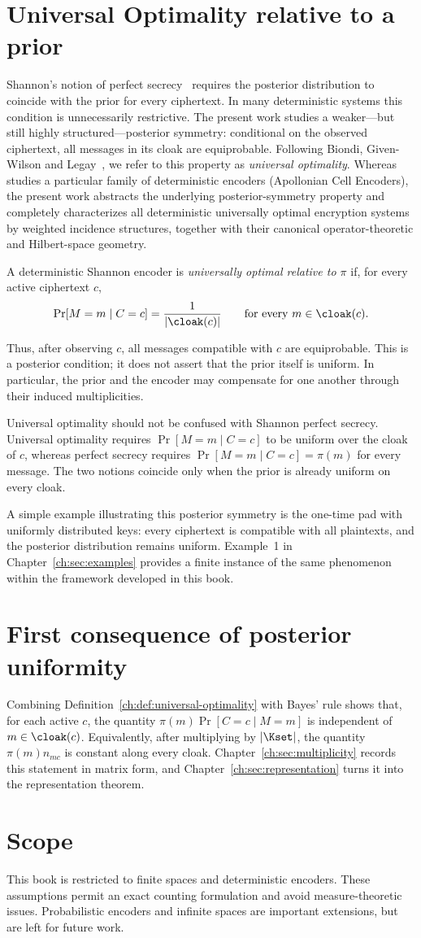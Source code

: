 \section{Universal Optimality relative to a prior}
Shannon's notion of perfect secrecy~\cite{shannon1949} requires the posterior distribution to coincide with the prior for every ciphertext.  In many deterministic systems this condition is unnecessarily restrictive.  The present work studies a weaker---but still highly structured---posterior symmetry: conditional on the observed ciphertext, all messages in its cloak are equiprobable.  Following Biondi, Given-Wilson and Legay~\cite{biondi2018apollonian}, we refer to this property as \emph{universal optimality}.
Whereas~\cite{biondi2018apollonian} studies a particular family of deterministic encoders (Apollonian Cell Encoders), the present work abstracts the underlying posterior-symmetry property and completely characterizes all deterministic universally optimal encryption systems by weighted incidence structures, together with their canonical operator-theoretic and Hilbert-space geometry.
\begin{definition}\label{ch:def:universal-optimality}
A deterministic Shannon encoder is \emph{universally optimal relative to $\pi$} if, for every active ciphertext $c$,
\[
  \Pr[M=m\mid C=c]=\frac{1}{|\cloak(c)|}
  \qquad\text{for every }m\in\cloak(c).
\]
\end{definition}
Thus, after observing $c$, all messages compatible with $c$ are equiprobable. This is a posterior condition; it does not assert that the prior itself is uniform. In particular, the prior and the encoder may compensate for one another through their induced multiplicities.
\begin{remark}
Universal optimality should not be confused with Shannon perfect secrecy.  Universal optimality requires $\Pr[M=m\mid C=c]$ to be uniform over the cloak of $c$, whereas perfect secrecy requires $\Pr[M=m\mid C=c]=\pi(m)$ for every message.  The two notions coincide only when the prior is already uniform on every cloak.
\end{remark}
A simple example illustrating this posterior symmetry is the one-time pad with uniformly distributed keys: every ciphertext is compatible with all plaintexts, and the posterior distribution remains uniform.  Example~1 in Chapter~\ref{ch:sec:examples} provides a finite instance of the same phenomenon within the framework developed in this book.
\section{First consequence of posterior uniformity}
Combining Definition~\ref{ch:def:universal-optimality} with Bayes' rule shows that, for each active $c$, the quantity $\pi(m)\Pr[C=c\mid M=m]$ is independent of $m\in\cloak(c)$. Equivalently, after multiplying by $|\Kset|$, the quantity $\pi(m)n_{mc}$ is constant along every cloak. Chapter~\ref{ch:sec:multiplicity} records this statement in matrix form, and Chapter~\ref{ch:sec:representation} turns it into the representation theorem.
\section{Scope}
This book is restricted to finite spaces and deterministic encoders. These assumptions permit an exact counting formulation and avoid measure-theoretic issues. Probabilistic encoders and infinite spaces are important extensions, but are left for future work.
\endinput
